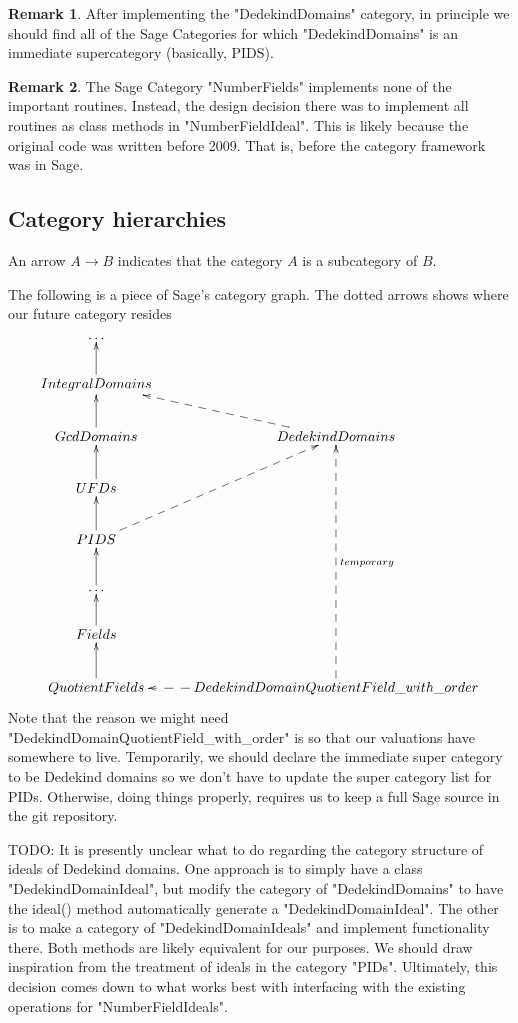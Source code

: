 \documentclass{amsart}
\theoremstyle{definition}
\newtheorem*{remark*}{Remark}
\begin{document}
			\begin{remark*}
				After implementing the "DedekindDomains" category, in principle we should find all of the Sage Categories for which "DedekindDomains" is an immediate supercategory (basically, PIDS). 
			\end{remark*}
	
			\begin{remark*}
				The Sage Category "NumberFields" implements none of the important routines. Instead, the design decision there was to implement all routines as class methods in "NumberFieldIdeal". This is likely because the original code was written before 2009. That is, before the category framework was in Sage. 
			\end{remark*}
	
	\subsection{Category hierarchies}
	
		An arrow $A \longrightarrow B$ indicates that the category $A$ is a subcategory of $B$.
		
		The following is a piece of Sage's category graph. The dotted arrows shows where our future category resides
		\[
		\xymatrix{
			\ldots \\
			IntegralDomains \ar[u] \\
			GcdDomains \ar[u]   &   DedekindDomains \ar@{-->}[ul] \\
			UFDs \ar[u] \\
			PIDS \ar[u] \ar@{-->}[uur] \\
			\ldots \ar[u] \\
			Fields \ar[u] \\
			QuotientFields \ar[u] &  DedekindDomainQuotientField\_with\_order \ar@{-->}[l] \ar@{-->}[uuuuu]_{temporary} 
		}
		\]
		Note that the reason we might need "DedekindDomainQuotientField\_with\_order" is so that our valuations have somewhere to live. Temporarily, we should declare the immediate super category to be Dedekind domains so we don't have to update the super category list for PIDs. Otherwise, doing things properly, requires us to keep a full Sage source in the git repository.
	
		\hspace{1in}
	
		TODO: It is presently unclear what to do regarding the category structure of ideals of Dedekind domains. One approach is to simply have a class "DedekindDomainIdeal", but modify the category of "DedekindDomains" to have the ideal() method automatically generate a "DedekindDomainIdeal". The other is to make a category of "DedekindDomainIdeals" and implement functionality there. Both methods are likely equivalent for our purposes. We should draw inspiration from the treatment of ideals in the category "PIDs". Ultimately, this decision comes down to what works best with interfacing with the existing operations for "NumberFieldIdeals".
			
\end{document}

